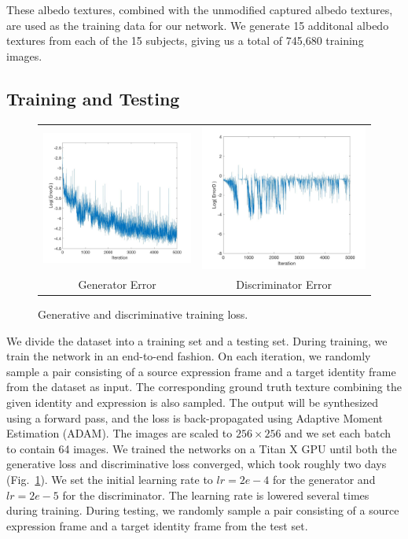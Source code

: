 These albedo textures, combined with the unmodified captured albedo textures, are used as the training data for our network. We generate 15 additonal albedo textures from each of the 15 subjects, giving us a total of 745,680 training images.

\subsection{Training and Testing}

\begin{figure}[h!]
\setlength\tabcolsep{1.5pt}
\centering
\begin{tabular}{cc}

\includegraphics[width=.22\textwidth]{figures/loss/ErrorG2.jpg}&
\includegraphics[width=.22\textwidth]{figures/loss/ErrorD2.jpg} \\
Generator Error & Discriminator Error \\ 
\end{tabular}
\caption{Generative and discriminative training loss.}\label{fig:error}
\vspace{-0.05in}
\end{figure} 



We divide the dataset into a training set and a testing set. During training, we train the network in an end-to-end fashion. On each iteration, we randomly sample a pair consisting of a source expression frame and a target identity frame from the dataset as input. The corresponding ground truth texture combining the given identity and expression is also sampled. The output will be synthesized using a forward pass, and the loss is back-propagated using Adaptive Moment Estimation (ADAM). The images are scaled to $256 \times 256$ and we set each batch to contain 64 images. We trained the networks on a Titan X GPU until both the generative loss and discriminative loss converged, which took roughly two days (Fig.~\ref{fig:error}). We set the initial learning rate to $lr=2e-4$ for the generator and $lr=2e-5$ for the discriminator. The learning rate is lowered several times during training. During testing, we randomly sample a pair consisting of a source expression frame and a target identity frame from the test set.

